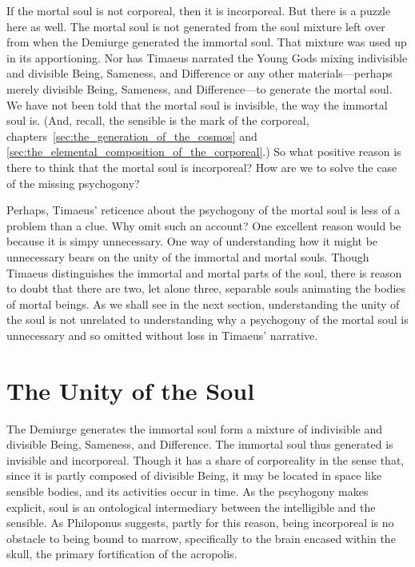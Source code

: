 If the mortal soul is not corporeal, then it is incorporeal. But there is a puzzle here as well. The mortal soul is not generated from the soul mixture left over from when the Demiurge generated the immortal soul. That mixture was used up in its apportioning. Nor has Timaeus narrated the Young Gods mixing indivisible and divisible Being, Sameness, and Difference or any other materials---perhaps merely divisible Being, Sameness, and Difference---to generate the mortal soul. We have not been told that the mortal soul is invisible, the way the immortal soul is. (And, recall, the sensible is the mark of the corporeal, chapters~\ref{sec:the_generation_of_the_cosmos} and \ref{sec:the_elemental_composition_of_the_corporeal}.) So what positive reason is there to think that the mortal soul is incorporeal? How are we to solve the case of the missing psychogony?

Perhaps, Timaeus' reticence about the psychogony of the mortal soul is less of a problem than a clue. Why omit such an account? One excellent reason would be because it is simpy unnecessary. One way of understanding how it might be unnecessary bears on the unity of the immortal and mortal souls. Though Timaeus distinguishes the immortal and mortal parts of the soul, there is reason to doubt that there are two, let alone three, separable souls animating the bodies of mortal beings. As we shall see in the next section, understanding the unity of the soul is not unrelated to understanding why a psychogony of the mortal soul is unnecessary and so omitted without loss in Timaeus' narrative.


\section{The Unity of the Soul} %
\label{sec:the_unity_of_the_soul}

The Demiurge generates the immortal soul form a mixture of indivisible and divisible Being, Sameness, and Difference. The immortal soul thus generated is invisible and incorporeal. Though it has a share of corporeality in the sense that, since it is partly composed of divisible Being, it may be located in space like sensible bodies, and its activities occur in time. As the pscyhogony makes explicit, soul is an ontological intermediary between the intelligible and the sensible. As Philoponus suggests, partly for this reason, being incorporeal is no obstacle to being bound to marrow, specifically to the brain encased within the skull, the primary fortification of the acropolis.

